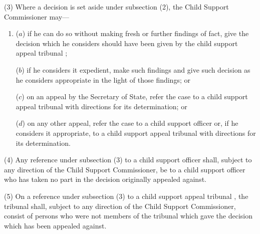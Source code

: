\documentclass[12pt,a4paper]{article}
\begin{document}
(3) Where a decision is set aside under subsection (2), the Child Support Commissioner may—
\begin{enumerate}\item[]
($a$) if he can do so without making fresh or further findings of fact, give the decision which he considers should have been given by 
the child support appeal tribunal%
;

($b$) if he considers it expedient, make such findings and give such decision as he considers appropriate in the light of those findings; or


($c$) on an appeal by the Secretary of State, refer the case to 
a child support appeal tribunal 
with directions for its determination; or

($d$) on any other appeal, refer the case to 
a child support officer 
or, if he considers it appropriate, to 
a child support appeal tribunal 
with directions for its determination.
\end{enumerate}

(4) Any reference under subsection (3)  to a child support officer shall, subject to any direction of the Child Support Commissioner, be to a child support officer who has taken no part in the decision originally appealed against.


(5) On a reference under subsection (3)  to 
a child support appeal tribunal%
, the tribunal shall, subject to any direction of the Child Support Commissioner, consist of persons who were not members of the tribunal which gave the decision which has been appealed against.
\end{document}
